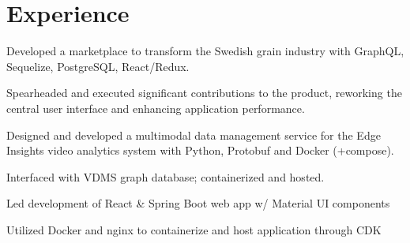 \documentclass[letterpaper]{cv} %
\begin{document}
\hfill
%
%
\begin{minipage}[t]{0.66\textwidth} %

  \section{Experience}
  \vspace{\topsep} %
  \begin{tightitemize}
    \item Developed a marketplace to transform the Swedish grain industry with GraphQL, Sequelize, PostgreSQL, React/Redux.
    \item Spearheaded and executed significant contributions to the product, reworking the central user interface and enhancing application performance.
  \end{tightitemize}
  \sectionspace

  \begin{tightitemize}
    \item Designed and developed a multimodal data management service for the Edge Insights video analytics system with Python, Protobuf and Docker (+compose).
    \item Interfaced with VDMS graph database; containerized and hosted.
  \end{tightitemize}
  \sectionspace


  \begin{tightitemize}
    \item Led development of React \& Spring Boot web app w/ Material UI components
    \item Utilized Docker and nginx to containerize and host application through CDK
  \end{tightitemize}
  \sectionspace


\end{minipage}
\end{document}
